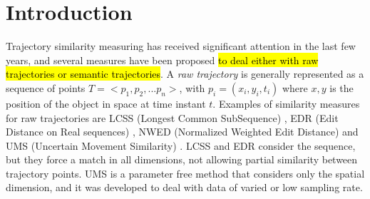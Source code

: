 \documentclass[12pt]{article}
\providecommand{\keywords}[1]
{
  \small    
  \textbf{\textit{Keywords---}} #1
}
\begin{document}
 




\section{Introduction}
Trajectory similarity measuring has received significant attention in the last few years, and several measures have been proposed \hl{to deal either with raw trajectories or semantic trajectories}. A \emph{raw trajectory} is generally represented as a sequence of points $T=<p_1, p_2, ...p_n>$, with $p_i=(x_i,y_i,t_i)$ where $x,y$ is the position of the object in space at time instant $t$.  Examples of similarity measures for raw trajectories are LCSS (Longest Common SubSequence) \citep{vlachos2002discovering}, EDR (Edit Distance on Real sequences) \citep{Chen:2005:RFS:1066157.1066213}, NWED (Normalized Weighted Edit Distance) \citep{dodge2012} and UMS (Uncertain Movement Similarity) \citep{Furtado-UMS-2018}. LCSS \citep{vlachos2002discovering} and EDR \citep{Chen:2005:RFS:1066157.1066213} consider the sequence, but they force a match in all dimensions, not allowing partial similarity between trajectory points.  
UMS \citep{Furtado-UMS-2018} is a parameter free method that considers only the spatial dimension, and it was developed to deal with data of varied or low sampling rate.
\end{document}
